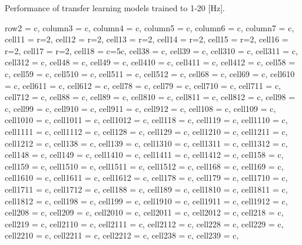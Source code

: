 \documentclass[journal]{IEEEtran}
\begin{document}
\begin{table}
\caption{Performance of transfer learning models trained to 1-20 [Hz].}
\centering
\begin{adjustbox}{width=\textwidth}
\begin{tblr}{
  row{2} = {c},  column{3} = {c},  column{4} = {c},  column{5} = {c},
  column{6} = {c},  column{7} = {c},  cell{1}{1} = {r=2}{},  cell{1}{2} = {r=2}{},
  cell{1}{3} = {r=2}{},  cell{1}{4} = {r=2}{},  cell{1}{5} = {r=2}{},  cell{1}{6} = {r=2}{},
  cell{1}{7} = {r=2}{},  cell{1}{8} = {c=5}{c},  cell{3}{8} = {c},  cell{3}{9} = {c},
  cell{3}{10} = {c},  cell{3}{11} = {c},  cell{3}{12} = {c},  cell{4}{8} = {c},
  cell{4}{9} = {c},  cell{4}{10} = {c},  cell{4}{11} = {c},  cell{4}{12} = {c},
  cell{5}{8} = {c},  cell{5}{9} = {c},  cell{5}{10} = {c},  cell{5}{11} = {c},
  cell{5}{12} = {c},  cell{6}{8} = {c},  cell{6}{9} = {c},  cell{6}{10} = {c},
  cell{6}{11} = {c},  cell{6}{12} = {c},  cell{7}{8} = {c},  cell{7}{9} = {c},
  cell{7}{10} = {c},  cell{7}{11} = {c},  cell{7}{12} = {c},  cell{8}{8} = {c},
  cell{8}{9} = {c},  cell{8}{10} = {c},  cell{8}{11} = {c},  cell{8}{12} = {c},
  cell{9}{8} = {c},  cell{9}{9} = {c},  cell{9}{10} = {c},  cell{9}{11} = {c},
  cell{9}{12} = {c},  cell{10}{8} = {c},  cell{10}{9} = {c},  cell{10}{10} = {c},
  cell{10}{11} = {c},  cell{10}{12} = {c},  cell{11}{8} = {c},  cell{11}{9} = {c},
  cell{11}{10} = {c},  cell{11}{11} = {c},  cell{11}{12} = {c},  cell{12}{8} = {c},
  cell{12}{9} = {c},  cell{12}{10} = {c},  cell{12}{11} = {c},  cell{12}{12} = {c},
  cell{13}{8} = {c},  cell{13}{9} = {c},  cell{13}{10} = {c},  cell{13}{11} = {c},
  cell{13}{12} = {c},  cell{14}{8} = {c},  cell{14}{9} = {c},  cell{14}{10} = {c},
  cell{14}{11} = {c},  cell{14}{12} = {c},  cell{15}{8} = {c},  cell{15}{9} = {c},
  cell{15}{10} = {c},  cell{15}{11} = {c},  cell{15}{12} = {c},  cell{16}{8} = {c},
  cell{16}{9} = {c},  cell{16}{10} = {c},  cell{16}{11} = {c},  cell{16}{12} = {c},
  cell{17}{8} = {c},  cell{17}{9} = {c},  cell{17}{10} = {c},  cell{17}{11} = {c},
  cell{17}{12} = {c},  cell{18}{8} = {c},  cell{18}{9} = {c},  cell{18}{10} = {c},
  cell{18}{11} = {c},  cell{18}{12} = {c},  cell{19}{8} = {c},  cell{19}{9} = {c},
  cell{19}{10} = {c},  cell{19}{11} = {c},  cell{19}{12} = {c},  cell{20}{8} = {c},
  cell{20}{9} = {c},  cell{20}{10} = {c},  cell{20}{11} = {c},  cell{20}{12} = {c},
  cell{21}{8} = {c},  cell{21}{9} = {c},  cell{21}{10} = {c},  cell{21}{11} = {c},
  cell{21}{12} = {c},  cell{22}{8} = {c},  cell{22}{9} = {c},  cell{22}{10} = {c},
  cell{22}{11} = {c},  cell{22}{12} = {c},  cell{23}{8} = {c},  cell{23}{9} = {c},
}
\end{tblr}
\end{adjustbox}
\end{table}
\end{document}
